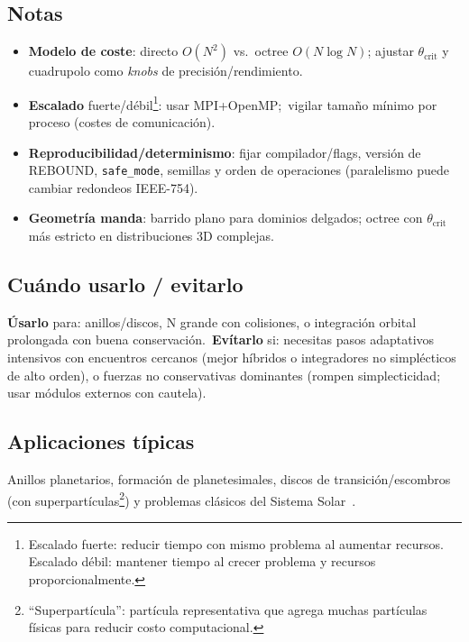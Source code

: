 \subsection{Notas}
\begin{itemize}
  \item \textbf{Modelo de coste}: directo $O(N^2)$ vs.\ octree $O(N\log N)$; ajustar $\theta_{\text{crit}}$ y cuadrupolo como \emph{knobs} de precisión/rendimiento.
  \item \textbf{Escalado} fuerte/débil\footnote{Escalado fuerte: reducir tiempo con mismo problema al aumentar recursos. Escalado débil: mantener tiempo al crecer problema y recursos proporcionalmente.}: usar MPI+OpenMP;\ vigilar tamaño mínimo por proceso (costes de comunicación).
  \item \textbf{Reproducibilidad/determinismo}: fijar compilador/flags, versión de REBOUND, \texttt{safe\_mode}, semillas y orden de operaciones (paralelismo puede cambiar redondeos IEEE-754).
  \item \textbf{Geometría manda}: barrido plano para dominios delgados; octree con $\theta_{\text{crit}}$ más estricto en distribuciones 3D complejas.
\end{itemize}

\subsection{Cuándo usarlo / evitarlo}
\textbf{Úsarlo} para: anillos/discos, N grande con colisiones, o integración orbital prolongada con buena conservación.\ \textbf{Evítarlo} si: necesitas pasos adaptativos intensivos con encuentros cercanos (mejor híbridos o integradores no simplécticos de alto orden), o fuerzas no conservativas dominantes (rompen simplecticidad; usar módulos externos con cautela).

\subsection{Aplicaciones típicas}
Anillos planetarios, formación de planetesimales, discos de transición/escombros (con superpartículas\footnote{“Superpartícula”: partícula representativa que agrega muchas partículas físicas para reducir costo computacional.}) y problemas clásicos del Sistema Solar~\cite{Rein2012}.

